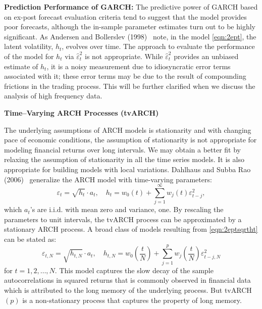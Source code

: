 \noindent\textbf{Prediction Performance of GARCH:} The predictive power of GARCH based on ex-post forecast evaluation criteria tend to suggest that the model provides poor forecasts, although the in-sample parameter estimates turn out to be highly significant. As Andersen and Bollerslev (1998)~\cite{andersen1998} note, in the model \eqref{eqn:2ept}, the latent volatility, $h_t$, evolves over time. The approach to evaluate the performance of the model for $h_t$ via $\hat{\varepsilon}_t^2$ is not appropriate. While $\hat{\varepsilon}_t^2$ provides an unbiased estimate of $h_t$, it is a noisy measurement due to idiosyncratic error terms associated with it; these error terms may be due to the result of compounding frictions in the trading process. This will be further clarified when we discuss the analysis of high frequency data. \twomedskip


\noindent \textbf{Time--Varying ARCH Processes (tvARCH)} \twomedskip


The underlying assumptions of ARCH models is stationarity and with changing pace of economic conditions, the assumption of stationarity is not appropriate for modeling financial returns over long intervals. We may obtain a better fit by relaxing the assumption of stationarity in all the time series models. It is also appropriate for building models with local variations. Dahlhaus and Subba Rao (2006)~\cite{dahlhaus2006} generalize the ARCH model with time-varying parameters:
	\begin{equation} \label{eqn:2eptsqrtht}
	\varepsilon_t = \sqrt{h_t}\cdot a_t, \quad h_t = w_0(t) + \sum_{j=1}^{\infty} w_j(t) \varepsilon_{t-j}^2,
	\end{equation}
which $a_t$'s are i.i.d. with mean zero and variance, one. By rescaling the parameters to unit intervals, the tvARCH process can be approximated by a stationary ARCH process. A broad class of models resulting from \eqref{eqn:2eptsqrtht} can be stated as:
	\begin{equation} \label{eqn:2eptN}
	\varepsilon_{t,N} = \sqrt{h_{t,N}} \cdot a_t, \quad h_{t,N} = w_0 \left( \frac{t}{N} \right) + \sum_{j=1}^pw_j \left (\frac{t}{N} \right) \varepsilon_{t-j,N}^2
	\end{equation}
for $t= 1, 2, \ldots, N$. This model captures the slow decay of the sample autocorrelations in squared returns that is commonly observed in financial data which is attributed to the long memory of the underlying process. But tvARCH$(p)$ is a non-stationary process that captures the property of long memory.


